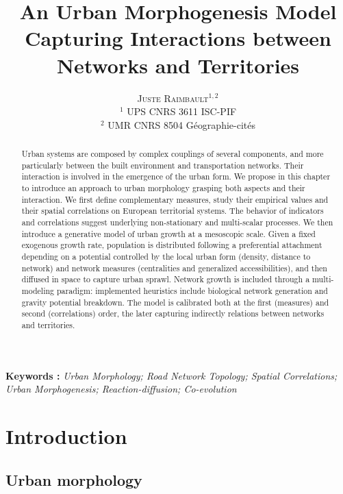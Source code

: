 \documentclass[11pt]{article}
\newcommand{\noun}[1]{\textsc{#1}}
\begin{document}
\title{An Urban Morphogenesis Model Capturing Interactions between Networks and Territories}
\author{\noun{Juste Raimbault}$^{1,2}$\\
$^1$ UPS CNRS 3611 ISC-PIF\\
$^2$ UMR CNRS 8504 G{\'e}ographie-cit{\'e}s
}
\date{}

\maketitle

\justify


\begin{abstract}
Urban systems are composed by complex couplings of several components, and more particularly between the built environment and transportation networks. Their interaction is involved in the emergence of the urban form. We propose in this chapter to introduce an approach to urban morphology grasping both aspects and their interaction. We first define complementary measures, study their empirical values and their spatial correlations on European territorial systems. The behavior of indicators and correlations suggest underlying non-stationary and multi-scalar processes. We then introduce a generative model of urban growth at a mesoscopic scale. Given a fixed exogenous growth rate, population is distributed following a preferential attachment depending on a potential controlled by the local urban form (density, distance to network) and network measures (centralities and generalized accessibilities), and then diffused in space to capture urban sprawl. Network growth is included through a multi-modeling paradigm: implemented heuristics include biological network generation and gravity potential breakdown. The model is calibrated both at the first (measures) and second (correlations) order, the later capturing indirectly relations between networks and territories.
\end{abstract}

\textbf{Keywords : }\textit{Urban Morphology; Road Network Topology; Spatial Correlations; Urban Morphogenesis; Reaction-diffusion; Co-evolution}



\section{Introduction}

\subsection{Urban morphology}
\end{document}
